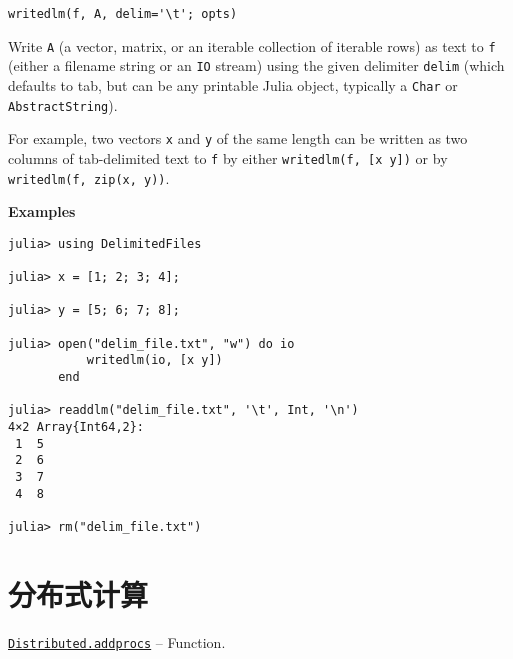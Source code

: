 \begin{adjustwidth}{2em}{0pt}


\begin{verbatim}
writedlm(f, A, delim='\t'; opts)
\end{verbatim}

Write \texttt{A} (a vector, matrix, or an iterable collection of iterable rows) as text to \texttt{f} (either a filename string or an \texttt{IO} stream) using the given delimiter \texttt{delim} (which defaults to tab, but can be any printable Julia object, typically a \texttt{Char} or \texttt{AbstractString}).

For example, two vectors \texttt{x} and \texttt{y} of the same length can be written as two columns of tab-delimited text to \texttt{f} by either \texttt{writedlm(f, [x y])} or by \texttt{writedlm(f, zip(x, y))}.

\textbf{Examples}


\begin{verbatim}
julia> using DelimitedFiles

julia> x = [1; 2; 3; 4];

julia> y = [5; 6; 7; 8];

julia> open("delim_file.txt", "w") do io
           writedlm(io, [x y])
       end

julia> readdlm("delim_file.txt", '\t', Int, '\n')
4×2 Array{Int64,2}:
 1  5
 2  6
 3  7
 4  8

julia> rm("delim_file.txt")
\end{verbatim}



\end{adjustwidth}

\hypertarget{18417912811524942081}{}


\chapter{分布式计算}


\hypertarget{2657399037748470653}{} 
\hyperlink{2657399037748470653}{\texttt{Distributed.addprocs}}  -- {Function.}

